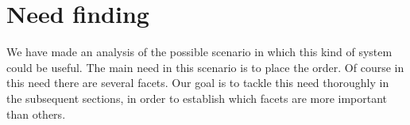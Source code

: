 \section{Need finding}
We have made an analysis of the possible scenario in which this kind
of system could be useful. 
The main need in this scenario is to place the order. Of course in this need there are several facets. Our goal is to tackle this need thoroughly in the subsequent sections, in order to establish which facets are more important than others.
